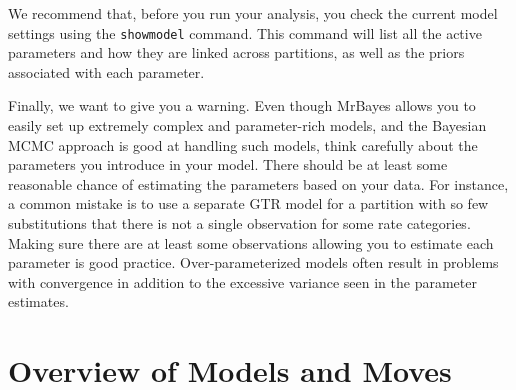 \documentclass[12pt]{book}
\begin{document}
We recommend that, before you run your analysis, you check the current model settings using the
\texttt{showmodel} command. This command will list all the active parameters and how they are
linked across partitions, as well as the priors associated with each parameter.

Finally, we want to give you a warning. Even though MrBayes allows you to easily set up extremely
complex and parameter-rich models, and the Bayesian MCMC approach is good at handling such models,
think carefully about the parameters you introduce in your model. There should be at least some
reasonable chance of estimating the parameters based on your data. For instance, a common mistake
is to use a separate GTR model for a partition with so few substitutions that there is not a single
observation for some rate categories. Making sure there are at least some observations allowing you
to estimate each parameter is good practice. Over-parameterized models often result in problems
with convergence in addition to the excessive variance seen in the parameter estimates.

\appendix

\chapter{Overview of Models and Moves}\label{appendixOverview}
\end{document}
